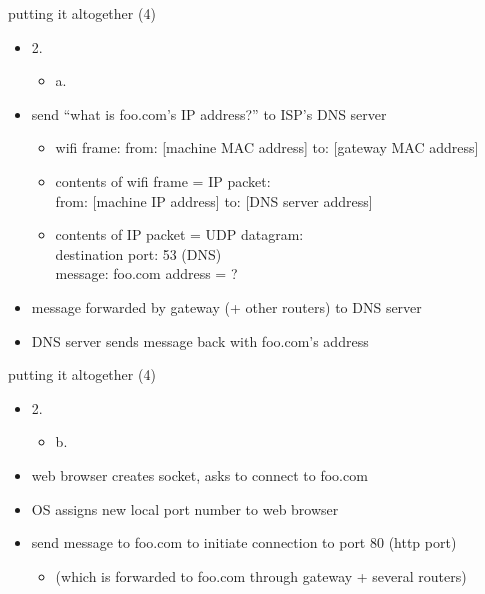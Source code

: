 \begin{frame}{putting it altogether (4)}
    \begin{itemize}
    \item 2. 
        \begin{itemize}
        \item a. 
        \end{itemize}
    \vspace{.5cm}
    \item<2-> send ``what is foo.com's IP address?'' to ISP's DNS server
        \begin{itemize}
        \item wifi frame: from: [machine MAC address] to: [gateway MAC address]
        \item contents of wifi frame = IP packet: \\
              from: [machine IP address] to: [DNS server address]
        \item contents of IP packet = UDP datagram: \\
              destination port: 53 (DNS) \\
              message: foo.com address = ?
        \end{itemize}
    \item<2-> message forwarded by gateway (+ other routers) to DNS server
    \item<2-> DNS server sends message back with foo.com's address
    \end{itemize}
\end{frame}

\begin{frame}{putting it altogether (4)}
    \begin{itemize}
    \item 2. 
        \begin{itemize}
        \item b. 
        \end{itemize}
    \vspace{.5cm}
    \item<2-> web browser creates socket, asks to connect to foo.com
    \item<2-> OS assigns new local port number to web browser
    \item<2-> send message to foo.com to initiate connection to port 80 (http port)
        \begin{itemize}
        \item<2-> (which is forwarded to foo.com through gateway + several routers)
        \end{itemize}
    \end{itemize}
\end{frame}

